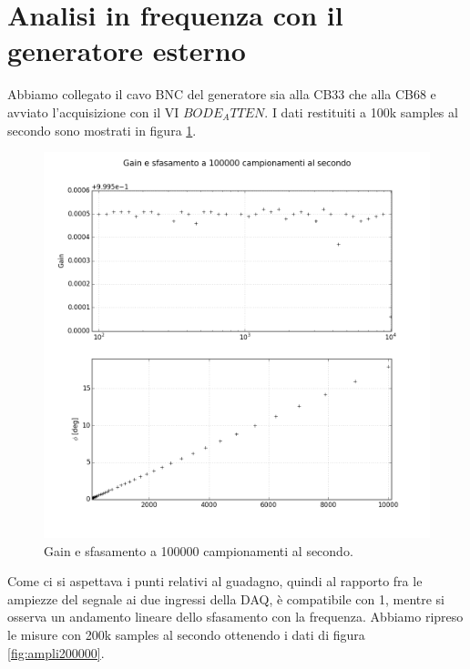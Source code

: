 \documentclass[journal, a4paper]{IEEEtran}
\begin{document}
\section{Analisi in frequenza con il generatore esterno}

Abbiamo collegato il cavo BNC del generatore sia alla CB33 che alla CB68 e avviato l'acquisizione con il VI $BODE_ATTEN$. I dati restituiti a 100k samples al secondo sono mostrati in figura \ref{fig:ampli100000}.

\begin{figure}[htp]
\centering
\includegraphics[scale=.3]{subplots_errors_amplitude100000}
\caption{Gain e sfasamento a 100000 campionamenti al secondo.}
\label{fig:ampli100000}
\end{figure}

Come ci si aspettava i punti relativi al guadagno, quindi al rapporto fra le ampiezze del segnale ai due ingressi della DAQ, è compatibile con 1, mentre si osserva un andamento lineare dello sfasamento con la frequenza. Abbiamo ripreso le misure con 200k samples al secondo ottenendo i dati di figura \ref{fig:ampli200000}. 
\end{document}

